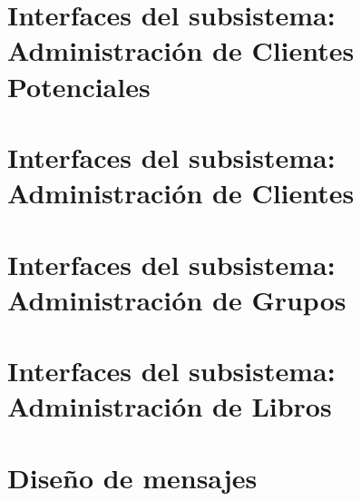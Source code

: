 \documentclass[10pt]{book}
\begin{document}
\section{Interfaces del subsistema: Administración de Clientes Potenciales}

\section{Interfaces del subsistema: Administración de Clientes}
\section{Interfaces del subsistema: Administración de Grupos}
\section{Interfaces del subsistema: Administración de Libros}

\section{Diseño de mensajes}

\clossing
\end{document}
